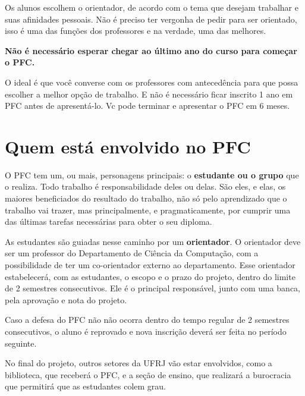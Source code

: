 Os alunos escolhem o orientador, de acordo com o tema que desejam trabalhar e suas afinidades pessoais. Não é preciso ter vergonha de pedir para ser orientado, isso é uma das funções dos professores e na verdade, uma das melhores.

\textbf{Não é necessário esperar chegar ao último ano do curso para começar o PFC. }

O ideal é que você converse com os professores com antecedência para que possa escolher a melhor opção de trabalho. E não é necessário ficar inscrito 1 ano em PFC antes de apresentá-lo. Vc pode terminar e apresentar o PFC em 6 meses.

\section{Quem está envolvido no PFC}

O PFC tem um, ou mais, personagens principais: o \textbf{estudante ou o grupo} que o realiza. Todo trabalho é responsabilidade deles ou delas. São eles, e elas, os maiores beneficiados do resultado do trabalho, não só pelo aprendizado que o trabalho vai trazer, mas principalmente, e pragmaticamente, por cumprir uma das últimas tarefas necessárias para obter o seu diploma.

As estudantes são guiadas nesse caminho por um \textbf{orientador}. O orientador deve ser um professor do Departamento de Ciência da Computação, com a possibilidade de ter um co-orientador externo ao departamento. Esse orientador estabelecerá, com as estudantes, o escopo e o prazo do projeto, dentro do limite de 2 semestres consecutivos. Ele é o principal responsável, junto com uma banca, pela aprovação e nota do projeto.

Caso a defesa do PFC não não ocorra dentro do tempo regular de 2 semestres consecutivos, o aluno é reprovado e nova inscrição deverá ser feita no período seguinte.

No final do projeto, outros setores da UFRJ vão estar envolvidos, como a biblioteca, que receberá o PFC, e a seção de ensino, que realizará a burocracia que permitirá que as estudantes colem grau.


